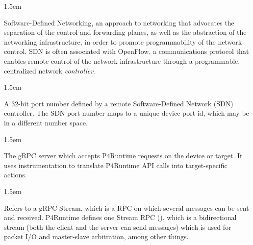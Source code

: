\documentclass[11pt]{article}
\begin{document}
{\begin{mddefinitions}
\begin{mdbmarginx}{}{}{}{1.5em}%
\begin{mddefdata}%
Software-Defined Networking, an approach to networking that advocates the
separation of the control and forwarding planes, as well as the abstraction
of the networking infrastructure, in order to promote programmability of the
network control. SDN is often associated with OpenFlow, a communications
protocol that enables remote control of the network infrastructure through a
programmable, centralized network \emph{controller}.
\end{mddefdata}%
\end{mdbmarginx}%


\begin{mdbmarginx}{}{}{}{1.5em}%
\begin{mddefdata}%
A 32-bit port number defined by a remote Software-Defined Network (SDN)
controller. The SDN port number maps to a unique device port id, which may
be in a different number space.
\end{mddefdata}%
\end{mdbmarginx}%


\begin{mdbmarginx}{}{}{}{1.5em}%
\begin{mddefdata}%
The gRPC server which accepts P4Runtime requests on the device or target. It
uses instrumentation to translate P4Runtime API calls into target-specific
actions.
\end{mddefdata}%
\end{mdbmarginx}%


\begin{mdbmarginx}{}{}{}{1.5em}%
\begin{mddefdata}%
Refers to a gRPC Stream, which is a RPC on which several messages can be
sent and received. P4Runtime defines one Stream RPC (), which
is a bidirectional stream (both the client and the server can send messages)
which is used for packet I/O and master-slave arbitration, among other
things.
\end{mddefdata}%
\end{mdbmarginx}%


\end{mddefinitions}}
\end{document}
